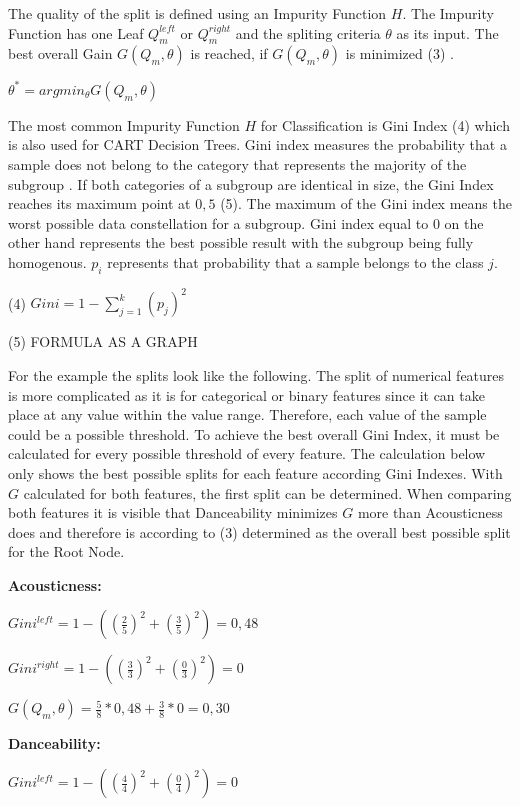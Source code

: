 The quality of the split is defined using an Impurity Function \(H\). The Impurity Function has one 
Leaf \(Q^{left}_{m}\) or \(Q^{right}_{m}\) and the spliting criteria \(\theta \) as its input. The 
best overall Gain \(G(Q_{m},\theta)\) is reached, if \(G(Q_{m},\theta)\) is minimized (3) \cite[10.10.6]{sklearn Decision Trees}. 

\(\theta ^* = argmin_{\theta}  G(Q_{m}, \theta)\)

The most common Impurity Function \(H\) for Classification is Gini Index (4) which is also used for CART
Decision Trees. Gini index measures the probability that a sample does not belong to the category
that represents the majority of the subgroup \cite[p.335]{James2021}. If both categories of a subgroup are identical in 
size, the Gini Index reaches its maximum point at \(0,5\) (5). The maximum of the Gini index means 
the worst possible data constellation for a subgroup. Gini index equal to \(0\) on the other 
hand represents the best possible result with the subgroup being fully homogenous. \(p_{i}\) represents that 
probability that a sample belongs to the class \(j\).

(4) \(Gini = 1 - \sum ^k_{j = 1}(p_{j})^2\)

(5) FORMULA AS A GRAPH

For the example the splits look like the following. The split of numerical features is more 
complicated as it is for categorical or binary features since it can take place at 
any value within the value range. Therefore, each value of the sample could be a possible 
threshold. To achieve the best overall Gini Index, it must be calculated for every possible 
threshold of every feature. The calculation below only shows the best possible splits for 
each feature according Gini Indexes. With \(G\) calculated for both features, the first split 
can be determined. When comparing both features it is visible that Danceability minimizes \(G\)
more than Acousticness does and therefore is according to (3) determined as the overall best possible split for 
the Root Node. 

\textbf{Acousticness:}

\(Gini^{left} = 1 - ((\frac{2}{5})^2 + (\frac{3}{5})^2) = 0,48 \)

\(Gini^{right}  = 1 - ((\frac{3}{3})^2 + (\frac{0}{3})^2) = 0 \)

\(G(Q_{m},\theta) = \frac{5}{8} * 0,48 + \frac{3}{8} * 0 = 0,30 \)

\textbf{Danceability:}

\(Gini^{left}  = 1 - ((\frac{4}{4})^2 + (\frac{0}{4})^2) = 0 \)

